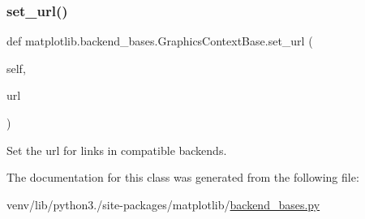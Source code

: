 \subsubsection{\texorpdfstring{set\+\_\+url()}{set\_url()}}
{\footnotesize\ttfamily def matplotlib.\+backend\+\_\+bases.\+Graphics\+Context\+Base.\+set\+\_\+url (\begin{DoxyParamCaption}\item[{}]{self,  }\item[{}]{url }\end{DoxyParamCaption})}

\begin{DoxyVerb}Set the url for links in compatible backends.\end{DoxyVerb}
 

The documentation for this class was generated from the following file\+:\begin{DoxyCompactItemize}
\item 
venv/lib/python3./site-\/packages/matplotlib/\hyperlink{backend__bases_8py}{backend\+\_\+bases.\+py}\end{DoxyCompactItemize}
